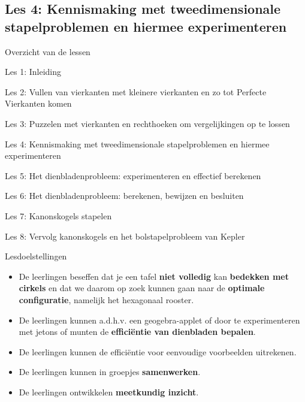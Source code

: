 \documentclass[dutch]{beamer}
\begin{document}
\subsection{Les 4: Kennismaking met tweedimensionale stapelproblemen en hiermee experimenteren}
\begin{frame}
{Overzicht van de lessen}
\begin{list}{\quad}{}
\item Les 1: Inleiding
\item Les 2: Vullen van vierkanten met kleinere vierkanten en zo tot Perfecte Vierkanten komen
\item Les 3: Puzzelen met vierkanten en rechthoeken om vergelijkingen op te lossen
\item {\color{blue}Les 4: Kennismaking met tweedimensionale stapelproblemen en hiermee experimenteren}
\item Les 5: Het dienbladenprobleem: experimenteren en effectief berekenen
\item Les 6: Het dienbladenprobleem: berekenen, bewijzen en besluiten
\item Les 7: Kanonskogels stapelen
\item Les 8: Vervolg kanonskogels en het bolstapelprobleem van Kepler
\end{list}
\end{frame}

\begin{frame}{Lesdoelstellingen}
\begin{itemize}
\item De leerlingen beseffen dat je een tafel \textbf{niet volledig} kan \textbf{bedekken met cirkels} en dat we daarom op zoek kunnen gaan naar de \textbf{optimale configuratie}, namelijk het hexagonaal rooster.
\item De leerlingen kunnen a.d.h.v. een geogebra-applet of door te experimenteren met jetons of munten de \textbf{effici\"{e}ntie van dienbladen bepalen}.
\item De leerlingen kunnen de effici\"{e}ntie voor eenvoudige voorbeelden uitrekenen.
\item De leerlingen kunnen in groepjes \textbf{samenwerken}.
\item De leerlingen ontwikkelen \textbf{meetkundig inzicht}.
\end{itemize}
\end{frame}
\end{document}
